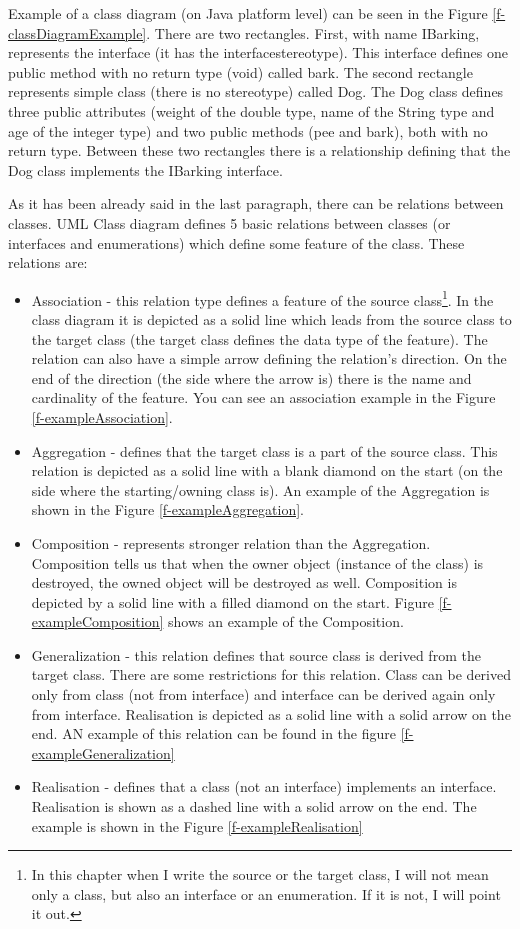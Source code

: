 Example of a class diagram (on Java platform level) can be seen in the Figure \ref{f-classDiagramExample}. There are two rectangles. First, with name IBarking, represents the interface (it has the \guillemotleft{}interface\guillemotright stereotype). This interface defines one public method with no return type (void) called bark. The second rectangle represents simple class (there is no stereotype) called Dog. The Dog class defines three public attributes (weight of the double type, name of the String type and age of the integer type) and two public methods (pee and bark), both with no return type. Between these two rectangles there is a relationship defining that the Dog class implements the IBarking interface.

As it has been already said in the last paragraph, there can be relations between classes. UML Class diagram defines 5 basic relations between classes (or interfaces and enumerations) which define some feature of the class. These relations are:

\begin{itemize}
    \item Association - this relation type defines a feature of the source class\footnote{In this chapter when I write the source or the target class, I will not mean only a class, but also an interface or an enumeration. If it is not, I will point it out.}. In the class diagram it is depicted as a solid line which leads from the source class to the target class (the target class defines the data type of the feature). The relation can also have a simple arrow defining the relation's direction. On the end of the direction (the side where the arrow is) there is the name and cardinality of the feature. You can see an association example in the Figure \ref{f-exampleAssociation}.
    \item Aggregation - defines that the target class is a part of the source class. This relation is depicted as a solid line with a blank diamond on the start (on the side where the starting/owning class is). An example of the Aggregation is shown in the Figure \ref{f-exampleAggregation}.
    \item Composition - represents stronger relation than the Aggregation. Composition tells us that when the owner object (instance of the class) is destroyed, the owned object will be destroyed as well. Composition is depicted by a solid line with a filled diamond on the start. Figure \ref{f-exampleComposition} shows an example of the Composition.
    \item Generalization - this relation defines that source class is derived from the target class. There are some restrictions for this relation. Class can be derived only from class (not from interface) and interface can be derived again only from interface. Realisation is depicted as a solid line with a solid arrow on the end. AN example of this relation can be found in the figure \ref{f-exampleGeneralization}
    \item Realisation - defines that a class (not an interface) implements an interface. Realisation is shown as a dashed line with a solid arrow on the end. The example is shown in the Figure \ref{f-exampleRealisation}
\end{itemize}

